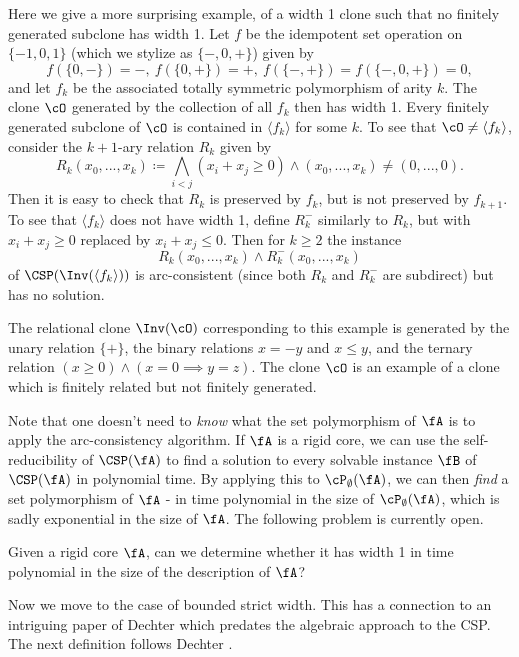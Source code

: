 \begin{ex}\label{width-1-not-finitely-gen} Here we give a more surprising example, of a width 1 clone such that no finitely generated subclone has width 1. Let $f$ be the idempotent set operation on $\{-1,0,1\}$ (which we stylize as $\{-,0,+\}$) given by
\[
f(\{0,-\}) = -,\ f(\{0,+\}) = +,\ f(\{-,+\}) = f(\{-,0,+\}) = 0,
\]
and let $f_k$ be the associated totally symmetric polymorphism of arity $k$. The clone $\cO$ generated by the collection of all $f_k$ then has width 1. Every finitely generated subclone of $\cO$ is contained in $\langle f_k\rangle$ for some $k$. To see that $\cO \ne \langle f_k \rangle$, consider the $k+1$-ary relation $R_k$ given by
\[
R_k(x_0, ..., x_k) \coloneqq \bigwedge_{i < j} (x_i + x_j \ge 0) \wedge (x_0, ..., x_k) \ne (0, ..., 0).
\]
Then it is easy to check that $R_k$ is preserved by $f_k$, but is not preserved by $f_{k+1}$. To see that $\langle f_k \rangle$ does not have width 1, define $R_k^-$ similarly to $R_k$, but with $x_i + x_j \ge 0$ replaced by $x_i + x_j \le 0$. Then for $k\ge 2$ the instance
\[
R_k(x_0, ..., x_k) \wedge R_k^-(x_0, ..., x_k)
\]
of $\CSP(\Inv(\langle f_k \rangle))$ is arc-consistent (since both $R_k$ and $R_k^-$ are subdirect) but has no solution.

The relational clone $\Inv(\cO)$ corresponding to this example is generated by the unary relation $\{+\}$, the binary relations $x = -y$ and $x \le y$, and the ternary relation $(x \ge 0) \wedge (x = 0 \implies y = z)$. The clone $\cO$ is an example of a clone which is finitely related but not finitely generated.
\end{ex}

Note that one doesn't need to \emph{know} what the set polymorphism of $\fA$ is to apply the arc-consistency algorithm. If $\fA$ is a rigid core, we can use the self-reducibility of $\CSP(\fA)$ to find a solution to every solvable instance $\fB$ of $\CSP(\fA)$ in polynomial time. By applying this to $\cP_\emptyset(\fA)$, we can then \emph{find} a set polymorphism of $\fA$ - in time polynomial in the size of $\cP_\emptyset(\fA)$, which is sadly exponential in the size of $\fA$. The following problem is currently open.

\begin{prob} Given a rigid core $\fA$, can we determine whether it has width 1 in time polynomial in the size of the description of $\fA$?
\end{prob}

Now we move to the case of bounded strict width. This has a connection to an intriguing paper of Dechter \cite{dechter} which predates the algebraic approach to the CSP. The next definition follows Dechter \cite{dechter}.

